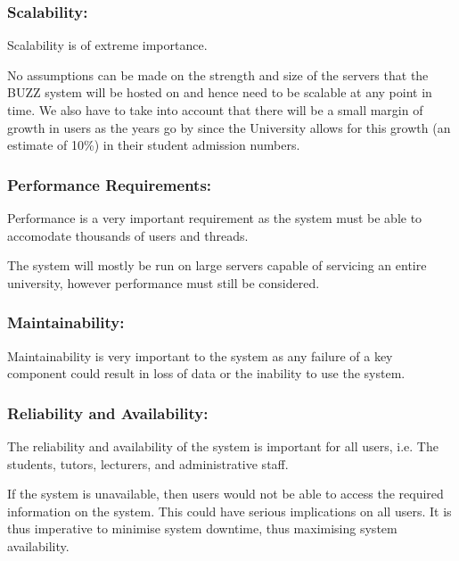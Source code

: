 
\subsubsection{Scalability:} 
Scalability is of extreme importance.

No assumptions can be made on the strength and size of the servers that the BUZZ system will be hosted on and hence need to be scalable at any point in time. We also have to take into account that there will be a small margin of growth in users as the years go by since the University allows for this growth (an estimate of 10\%) in their student admission numbers.

	\subsubsection{Performance Requirements:} 
Performance is a very important requirement as the system must be able to accomodate thousands of users and threads.

The system will mostly be run on large servers capable of servicing an entire university, however performance must still be considered.

	\subsubsection{Maintainability:} 
Maintainability is very important to the system as any failure of a key component could result in loss of data or the inability to use the system.

	\subsubsection{Reliability and Availability:} 
The reliability and availability of the system is important for all users, i.e. The students, tutors, lecturers, and administrative staff.

If the system is unavailable, then users would not be able to access the required information on the system. This could have serious implications on all users. It is thus imperative to minimise system downtime, thus maximising system availability.	
		
